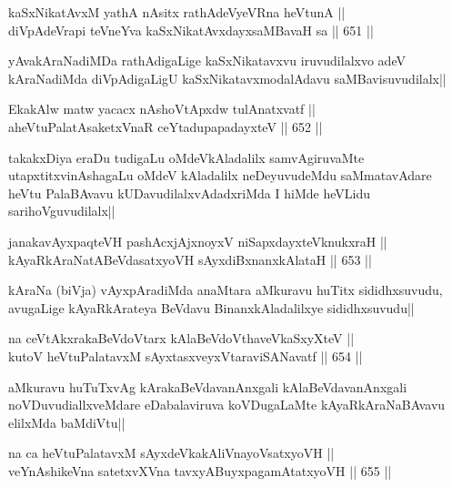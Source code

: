 \begin{shl}
kaSxNikatAvxM yathA nAsitx rathAdeVyeVRna heVtunA ||  \\
diVpAdeVrapi teVneYva kaSxNikatAvxdayxsaMBavaH sa ||  651 ||  
\end{shl}

\begin{artha}
yAvakAraNadiMDa rathAdigaLige kaSxNikatavxvu iruvudilalxvo adeV kAraNadiMda diVpAdigaLigU kaSxNikatavxmodalAdavu saMBavisuvudilalx||
\end{artha}

\begin{shl}
EkakAlw matw yacacx nAshoVtApxdw tulAnatxvatf || \\
aheVtuPalatAsaketxVnaR ceYtadupapadayxteV ||  652 ||  
\end{shl}

\begin{artha}
takakxDiya eraDu tudigaLu oMdeVkAladalilx samvAgiruvaMte utapxtitxvinAshagaLu oMdeV kAladalilx neDeyuvudeMdu saMmatavAdare heVtu PalaBAvavu kUDavudilalxvAdadxriMda I hiMde heVLidu sarihoVguvudilalx||
\end{artha}


\begin{shl}
janakavAyxpaqteVH pashAcxjAjxnoyxV niSapxdayxteV\s knukxraH || \\
kAyaRkAraNatABeVdasatxyoVH sAyxdiBxnanxkAlataH ||  653 ||  
\end{shl}

\begin{artha}
kAraNa (biVja) vAyxpAradiMda anaMtara aMkuravu huTitx sididhxsuvudu, avugaLige kAyaRkArateya BeVdavu BinanxkAladalilxye sididhxsuvudu||
\end{artha}

\begin{shl}
na ceVtAkxrakaBeVdoV\s tarx kAlaBeVdoV\s thaveVkaSxyXteV ||  \\
kutoV heVtuPalatavxM sAyxtasxveyxVtaraviSANavatf ||  654 ||  
\end{shl}

\begin{artha}
aMkuravu huTuTxvAg kArakaBeVdavanAnxgali kAlaBeVdavanAnxgali noVDuvudiallxveMdare eDabalaviruva koVDugaLaMte kAyaRkAraNaBAvavu elilxMda baMdiVtu||
\end{artha}

\begin{shl}
na ca heVtuPalatavxM sAyxdeVkakAliVnayoVsatxyoVH || \\
veYnAshikeVna satetxvXVna tavxyA\s BuyxpagamAtatxyoVH ||  655 ||  
\end{shl}

